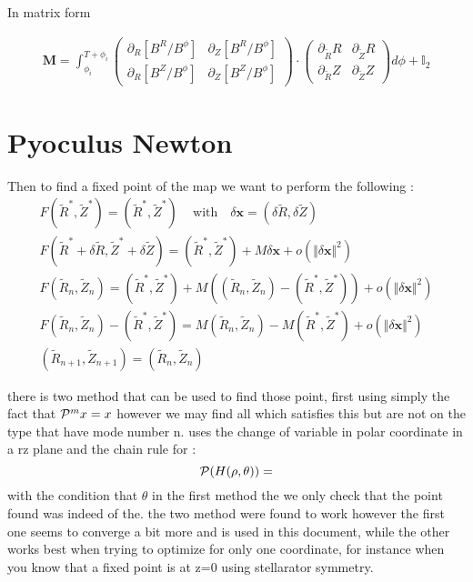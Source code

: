 In matrix form

\begin{align}
    \textbf{M} = \int_{\phi_i}^{T+\phi_i}\begin{pmatrix}
        \partial_{R}\left[B^R/B^\phi\right] & \partial_{Z}\left[B^R/B^\phi\right]\\
        \partial_{R}\left[B^Z/B^\phi\right] & \partial_{Z}\left[B^Z/B^\phi\right]
    \end{pmatrix}\cdot\begin{pmatrix}
        \partial_{\tilde{R}}R & \partial_{\tilde{Z}}R\\
        \partial_{\tilde{R}}Z & \partial_{\tilde{Z}}Z
    \end{pmatrix}d\phi + \mathbb{I}_2
\end{align}

\section{Pyoculus Newton}

Then to find a fixed point of the map we want to perform the following :
\begin{align*}
    F(\tilde{R}^*, \tilde{Z}^*) = (\tilde{R}^*, \tilde{Z}^*)\,\quad\text{with}\quad \delta\textbf{x}=(\delta \tilde{R}, \delta \tilde{Z})\\
    F(\tilde{R}^*+\delta \tilde{R}, \tilde{Z}^*+\delta \tilde{Z}) = (\tilde{R}^*, \tilde{Z}^*) + M\delta\textbf{x}+ o(\Vert \delta\textbf{x}\Vert^2)\\
    F(\tilde{R}_n,\tilde{Z}_n) = (\tilde{R}^*, \tilde{Z}^*) + M((\tilde{R}_n,\tilde{Z}_n) - (\tilde{R}^*, \tilde{Z}^*))+ o(\Vert \delta\textbf{x}\Vert^2)\\
    F(\tilde{R}_n,\tilde{Z}_n) - (\tilde{R}^*, \tilde{Z}^*)  = M(\tilde{R}_n,\tilde{Z}_n) - M(\tilde{R}^*, \tilde{Z}^*)+ o(\Vert \delta\textbf{x}\Vert^2)\\
    (\tilde{R}_{n+1},\tilde{Z}_{n+1}) = (\tilde{R}_n,\tilde{Z}_n)
\end{align*}

there is two method that can be used to find those point, first using simply the fact that $\mathcal{P}^m x = x$ however we may find all which satisfies this but are not on the type that have mode number n. uses the change of variable in polar coordinate in a rz plane and the chain rule for :
\begin{equation*}
    \mathcal{P}(H(\rho,\theta)) = 
\end{equation*}
with the condition that $\theta$
in the first method the we only check that the point found was indeed of the. the two method were found to work however the first one seems to converge a bit more and is used in this document, while the other works best when trying to optimize for only one coordinate, for instance when you know that a fixed point is at z=0 using stellarator symmetry.
